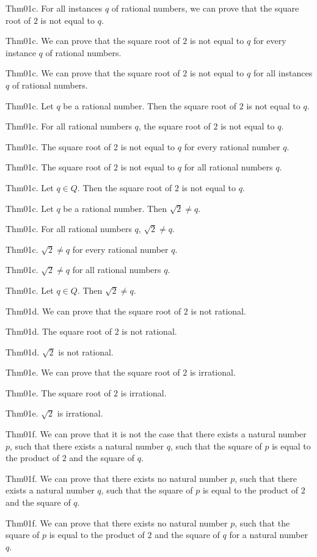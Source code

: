 \documentclass{article}
\begin{document}
Thm01c. For all instances $q$ of rational numbers, we can prove that the square root of $2$ is not equal to $q$.

Thm01c. We can prove that the square root of $2$ is not equal to $q$ for every instance $q$ of rational numbers.

Thm01c. We can prove that the square root of $2$ is not equal to $q$ for all instances $q$ of rational numbers.

Thm01c. Let $q$ be a rational number. Then the square root of $2$ is not equal to $q$.

Thm01c. For all rational numbers $q$, the square root of $2$ is not equal to $q$.

Thm01c. The square root of $2$ is not equal to $q$ for every rational number $q$.

Thm01c. The square root of $2$ is not equal to $q$ for all rational numbers $q$.

Thm01c. Let $q \in Q$. Then the square root of $2$ is not equal to $q$.

Thm01c. Let $q$ be a rational number. Then $\sqrt{ 2}\neq q$.

Thm01c. For all rational numbers $q$, $\sqrt{ 2}\neq q$.

Thm01c. $\sqrt{ 2}\neq q$ for every rational number $q$.

Thm01c. $\sqrt{ 2}\neq q$ for all rational numbers $q$.

Thm01c. Let $q \in Q$. Then $\sqrt{ 2}\neq q$.

Thm01d. We can prove that the square root of $2$ is not rational.

Thm01d. The square root of $2$ is not rational.

Thm01d. $\sqrt{ 2}$ is not rational.

Thm01e. We can prove that the square root of $2$ is irrational.

Thm01e. The square root of $2$ is irrational.

Thm01e. $\sqrt{ 2}$ is irrational.

Thm01f. We can prove that it is not the case that there exists a natural number $p$, such that there exists a natural number $q$, such that the square of $p$ is equal to the product of $2$ and the square of $q$.

Thm01f. We can prove that there exists no natural number $p$, such that there exists a natural number $q$, such that the square of $p$ is equal to the product of $2$ and the square of $q$.

Thm01f. We can prove that there exists no natural number $p$, such that the square of $p$ is equal to the product of $2$ and the square of $q$ for a natural number $q$.
\end{document}
